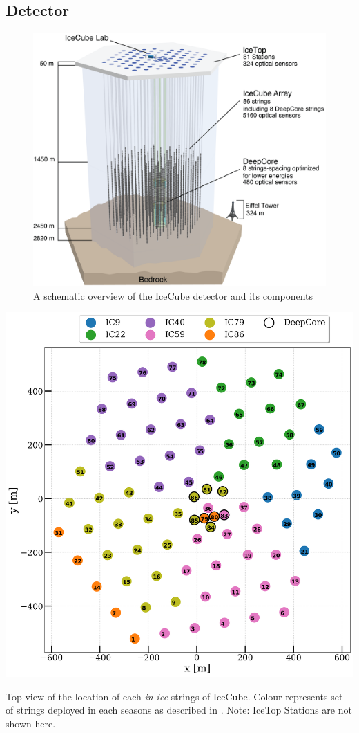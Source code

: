 \subsection{Detector}
\begin{figure}
	\centering \includegraphics{./figures/nu_in_icecube/IceCubeArray_slim.png}
	\caption{A schematic overview of the IceCube detector and its components \cite{Aartsen_2017}}
\end{figure}
    
\begin{marginfigure}
	\includegraphics{./figures/nu_in_icecube/IC_Phase_Array.png}
	\caption{Top view of the location of each \emph{in-ice} strings of IceCube. Colour represents set of strings deployed in each seasons as described in . Note: IceTop Stations are not shown here.}
\end{marginfigure}

